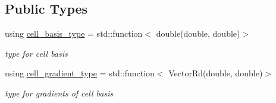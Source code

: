 \subsection*{Public Types}
\begin{DoxyCompactItemize}
\item 
\mbox{\label{classHArDCore2D_1_1BPNCCore_a3aa8544d9ea9ae31d70e65aaefb0e9c8}} 
using \hyperlink{classHArDCore2D_1_1BPNCCore_a3aa8544d9ea9ae31d70e65aaefb0e9c8}{cell\+\_\+basis\+\_\+type} = std\+::function$<$ double(double, double)$>$
\begin{DoxyCompactList}\small\item\em type for cell basis \end{DoxyCompactList}\item 
\mbox{\label{classHArDCore2D_1_1BPNCCore_a3e1f027c19acfc768851fbdbb00f2eec}} 
using \hyperlink{classHArDCore2D_1_1BPNCCore_a3e1f027c19acfc768851fbdbb00f2eec}{cell\+\_\+gradient\+\_\+type} = std\+::function$<$ Vector\+Rd(double, double)$>$
\begin{DoxyCompactList}\small\item\em type for gradients of cell basis \end{DoxyCompactList}\end{DoxyCompactItemize}
